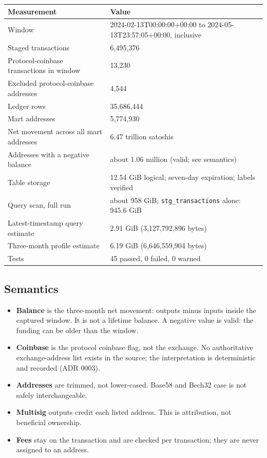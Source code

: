 \documentclass[10pt,a4paper]{article}
\newcommand{\code}[1]{\nolinkurl{#1}}
\begin{document}
{\small
\begin{tabularx}{\textwidth}{L{56mm}Y}
\toprule
\textbf{Measurement} & \textbf{Value} \\
\midrule
Window & 2024-02-13T00:00:00+00:00 to 2024-05-13T23:57:05+00:00, inclusive \\
Staged transactions & 6,495,376 \\
Protocol-coinbase transactions in window & 13,230 \\
Excluded protocol-coinbase addresses & 4,544 \\
Ledger rows & 35,686,444 \\
Mart addresses & 5,774,930 \\
Net movement across all mart addresses & 6.47 trillion satoshis \\
Addresses with a negative balance & about 1.06 million (valid; see semantics) \\
Table storage & 12.54 GiB logical; seven-day expiration; labels verified \\
Query scan, full run & about 958 GiB; \code{stg_transactions} alone: 945.6 GiB \\
Latest-timestamp query estimate & 2.91 GiB (3,127,792,896 bytes) \\
Three-month profile estimate & 6.19 GiB (6,646,559,904 bytes) \\
Tests & 45 passed, 0 failed, 0 warned \\
\bottomrule
\end{tabularx}
}

\subsection{Semantics}

\begin{itemize}
  \item \textbf{Balance} is the three-month net movement: outputs minus
        inputs inside the captured window. It is not a lifetime balance.
        A negative value is valid: the funding can be older than the
        window.
  \item \textbf{Coinbase} is the protocol coinbase flag, not the
        exchange. No authoritative exchange-address list exists in the
        source; the interpretation is deterministic and recorded
        (ADR 0003).
  \item \textbf{Addresses} are trimmed, not lower-cased. Base58 and
        Bech32 case is not safely interchangeable.
  \item \textbf{Multisig} outputs credit each listed address. This is
        attribution, not beneficial ownership.
  \item \textbf{Fees} stay on the transaction and are checked per
        transaction; they are never assigned to an address.
\end{itemize}
\end{document}
